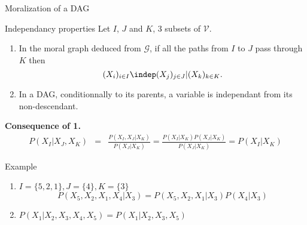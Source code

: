 \documentclass[compress,10pt]{beamer}
\begin{document}
 
\begin{frame}{Moralization of a DAG}
\begin{block}{Independancy properties}
Let $I$, $J$ and $K$, 3 subsets of $\mathcal{V}$. 

\begin{enumerate}
 \item In the moral graph deduced from $\mathcal{G}$, if all the paths from $I$ to $J$ pass through  $K$ then 
 $$ (X_i)_{i \in I} \indep  (X_j)_{j \in J} | (X_k)_{k \in K}.$$
\item In a DAG, conditionnally to its parents, a variable is independant from its non-descendant. 
\end{enumerate}


\vspace{1em}  
 
\end{block}

\textbf{Consequence of 1.}
\begin{eqnarray*}
 P(X_I | X_J, X_K) &=& \frac{P(X_I , X_J |  X_K)}{P(X_J | X_K)} =  \frac{P(X_I  | X_K)P(X_J | X_K)}{P(X_J | X_K)} = P(X_I  | X_K) 
\end{eqnarray*}

\end{frame}

 
\begin{frame}{Example}

\begin{enumerate}
 \item $I = \{5,2,1\}, J = \{4\}, K = \{3\}$
 $$P(X_5,X_2,X_1,X_4 | X_3) = P(X_5,X_2,X_1 | X_3) P(X_4 | X_3)$$
 \item $P(X_1 | X_2,X_3,X_4,X_5) = P(X_1 | X_2,X_3,X_5) $
 \end{enumerate}
\end{frame}
\end{document}
